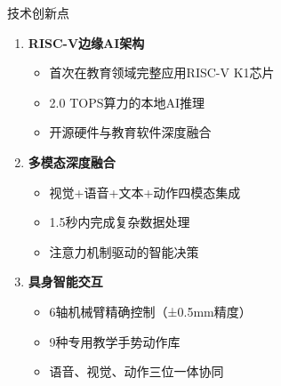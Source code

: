 \documentclass[aspectratio=169,12pt]{beamer}
\newcommand{\highlight}[1]{\textcolor{primaryblue}{\textbf{#1}}}
\begin{document}
\begin{frame}{技术创新点}
    \begin{enumerate}
        \item \highlight{RISC-V边缘AI架构}
        \begin{itemize}
            \item 首次在教育领域完整应用RISC-V K1芯片
            \item 2.0 TOPS算力的本地AI推理
            \item 开源硬件与教育软件深度融合
        \end{itemize}
        
        \item \highlight{多模态深度融合}  
        \begin{itemize}
            \item 视觉+语音+文本+动作四模态集成
            \item 1.5秒内完成复杂数据处理
            \item 注意力机制驱动的智能决策
        \end{itemize}
        
        \item \highlight{具身智能交互}
        \begin{itemize}
            \item 6轴机械臂精确控制（±0.5mm精度）
            \item 9种专用教学手势动作库
            \item 语音、视觉、动作三位一体协同
        \end{itemize}
    \end{enumerate}
\end{frame}
\end{document}

